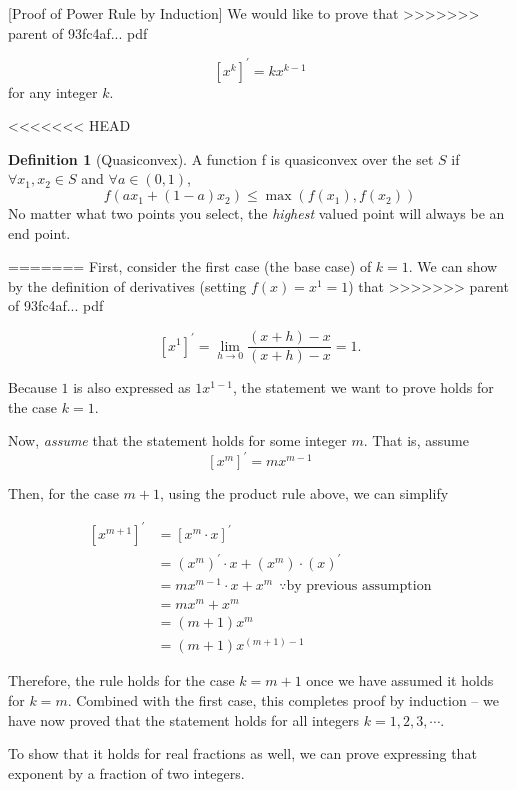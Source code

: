 \documentclass[]{book}
\theoremstyle{definition}
\newtheorem{definition}{Definition}[chapter]
\theoremstyle{definition}
\theoremstyle{definition}
\theoremstyle{remark}
\begin{document}
[Proof of Power Rule by Induction]
{}
We would like to prove that
>>>>>>> parent of 93fc4af... pdf

\[\left[x^k\right]^\prime = k x^{k-1}\]
for any integer \(k\).

<<<<<<< HEAD
\begin{definition}[Quasiconvex]
\protect\hypertarget{def:unnamed-chunk-51}{}{\label{def:unnamed-chunk-51} {} }A function f is quasiconvex over the set \(S\) if \(\forall x_1,x_2 \in S\) and \(\forall a \in (0,1)\), \[f(ax_1 + (1-a)x_2) \le \max(f(x_1),f(x_2))\]
No matter what two points you select, the \textit{highest} valued point will always be an end point.
\end{definition}
=======
First, consider the first case (the base case) of \(k = 1\). We can show by the definition of derivatives (setting \(f(x) = x^1 = 1\)) that
>>>>>>> parent of 93fc4af... pdf

\[[x^1]^\prime = \lim_{h \rightarrow 0}\frac{(x + h) - x}{(x + h) - x}= 1.\]

Because \(1\) is also expressed as \(1 x^{1- 1}\), the statement we want to prove holds for the case \(k =1\).

Now, \emph{assume} that the statement holds for some integer \(m\). That is, assume
\[\left[x^m\right]^\prime = m x^{m-1}\]

Then, for the case \(m + 1\), using the product rule above, we can simplify

\begin{align*}
\left[x^{m + 1}\right]^\prime &= [x^{m}\cdot x]^\prime\\
&= (x^m)^\prime\cdot x + (x^m)\cdot (x)^\prime\\
&= m x^{m - 1}\cdot x + x^m ~~\because \text{by previous assumption}\\
&= mx^m + x^m\\
&= (m + 1)x^m\\
&= (m + 1)x^{(m + 1) - 1}
\end{align*}

Therefore, the rule holds for the case \(k = m + 1\) once we have assumed it holds for \(k = m\). Combined with the first case, this completes proof by induction -- we have now proved that the statement holds for all integers \(k = 1, 2, 3, \cdots\).

To show that it holds for real fractions as well, we can prove expressing that exponent by a fraction of two integers.
\end{document}
